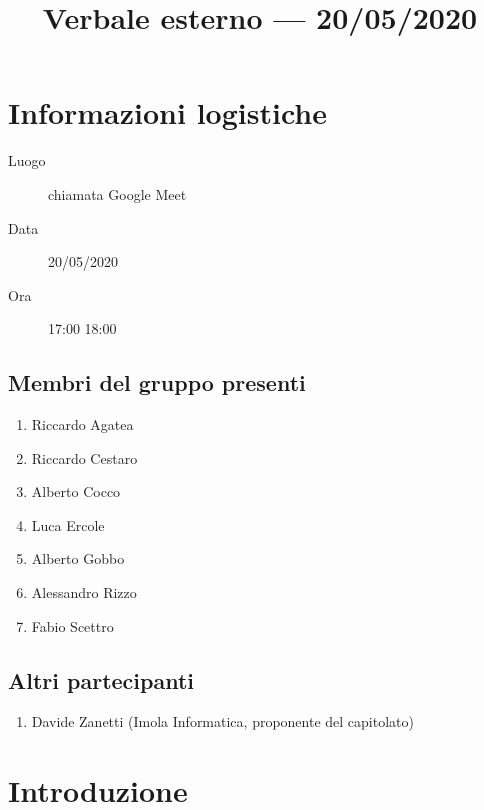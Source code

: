 \documentclass{article}
\title{Verbale esterno --- 20/05/2020}
\begin{document}


\section{Informazioni logistiche}%
\label{sec:informazioni_logistiche}

\begin{description}
  \item [Luogo] chiamata Google Meet
  \item [Data] 20/05/2020
  \item [Ora] 17:00  18:00
\end{description}

\subsection{Membri del gruppo presenti}%
\label{sub:membri_del_gruppo_presenti}

\begin{enumerate}
  \item Riccardo Agatea
  \item Riccardo Cestaro
  \item Alberto Cocco
  \item Luca Ercole
  \item Alberto Gobbo
  \item Alessandro Rizzo
  \item Fabio Scettro
\end{enumerate}


\subsection{Altri partecipanti}%
\label{sub:altri_partecipanti}

\begin{enumerate}
  \item Davide Zanetti (Imola Informatica, proponente del capitolato)
\end{enumerate}


\section{Introduzione}%
\label{sec:introduzione}
\end{document}
